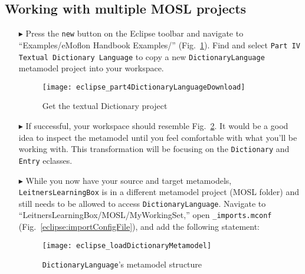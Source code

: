 \newpage
\hypertarget{multiMOSL}{}
\subsection{Working with multiple MOSL projects}
\texHeader

\begin{itemize}

\item[$\blacktriangleright$] Press the \texttt{new} button on the Eclipse toolbar and navigate to ``Examples/eMoflon Handbook Examples/''
(Fig.~\ref{eclipse:dictionaryDownloadWizard}). Find and select \texttt{Part IV Textual Dictionary Language} to copy a new \texttt{Dict\-ion\-ary\-Lang\-uage}
metamodel project into your workspace.

\begin{figure}[htbp]
\begin{center}
  \texttt{[image: eclipse\_part4DictionaryLanguageDownload]}
  \caption{Get the textual Dictionary project}
  \label{eclipse:dictionaryDownloadWizard}
\end{center}
\end{figure}

\item[$\blacktriangleright$] If successful, your workspace should resemble Fig.~\ref{eclipse:loadedDictionaryMetamodel}. It would be a good idea to inspect the
metamodel until you feel comfortable with what you'll be working with. This transformation will be focusing on the \texttt{Dictionary} and \texttt{Entry}
eclasses.

\item[$\blacktriangleright$] While you now have your source and target metamodels, \texttt{Leit\-ners\-Learn\-ing\-Box} is in a different metamodel project
(MOSL folder) and still needs to be allowed to access \texttt{Dict\-ion\-ary\-Lang\-uage}. Navigate to ``LeitnersLearningBox/MOSL/MyWorkingSet,'' open
\texttt{\_imports.mconf} (Fig.~\ref{eclipse:importConfigFile}), and add the following statement:

\newpage

\begin{figure}[htbp]
\begin{center}
  \texttt{[image: eclipse\_loadDictionaryMetamodel]}
  \caption{\texttt{DictionaryLanguage}'s metamodel structure}
  \label{eclipse:loadedDictionaryMetamodel}
\end{center}
\end{figure}


\end{itemize}
